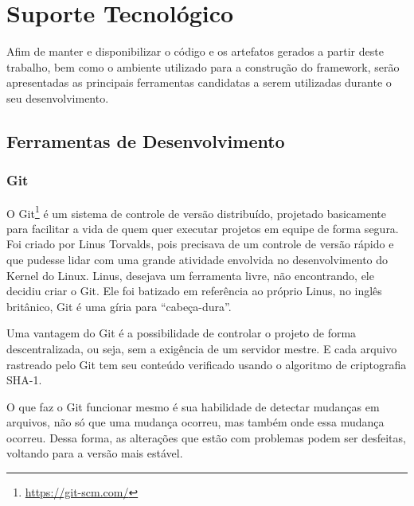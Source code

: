 \chapter{Suporte Tecnológico}

Afim de manter e disponibilizar o código e os artefatos gerados a partir deste trabalho, bem como o ambiente utilizado para a construção do framework, serão apresentadas as principais ferramentas candidatas a serem utilizadas durante o seu desenvolvimento.

\section{Ferramentas de Desenvolvimento}

\subsection{Git}

O Git\footnote{\url{https://git-scm.com/}} é um sistema de controle de versão distribuído, projetado basicamente para facilitar a vida de quem quer executar projetos em equipe de forma segura. Foi criado por Linus Torvalds, pois precisava de um controle de versão rápido e que pudesse lidar com uma grande atividade envolvida no desenvolvimento do Kernel do Linux. Linus, desejava um ferramenta livre, não encontrando, ele decidiu criar o Git. Ele foi batizado em referência ao próprio Linus, no inglês britânico, Git é uma gíria para ``cabeça-dura''.

Uma vantagem do Git é a possibilidade de controlar o projeto de forma descentralizada, ou seja, sem a exigência de um servidor mestre. E cada arquivo rastreado pelo Git tem seu conteúdo verificado usando o algoritmo de criptografia SHA-1.

O que faz o Git funcionar mesmo é sua habilidade de detectar mudanças em arquivos, não só que uma mudança ocorreu, mas também onde essa mudança ocorreu. Dessa forma, as alterações que estão com problemas podem ser desfeitas, voltando para a versão mais estável.

